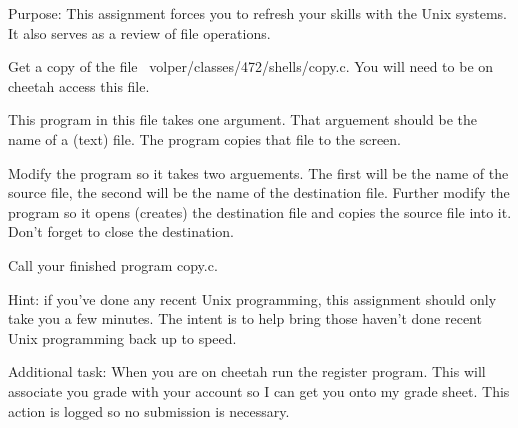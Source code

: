 

\parindent 0pt

Purpose: This assignment forces you to refresh your skills with the Unix
systems.
It also serves as a review of file operations.

Get a copy of the file {\ltt{}~volper/classes/472/shells/copy.c}.
You will need to be on {\ltt{}cheetah} access this file.

This program in this file takes one argument. 
That arguement should be the name of a (text) file.
The program copies that file to the screen.

Modify the program so it takes two arguements.
The first will be the name of the source file, the second
will be the name of the destination file.
Further modify the program so it opens (creates) the destination
file and copies the source file into it.
Don't forget to close the destination.

Call your finished program {\ltt{}copy.c}.

Hint: if you've done any recent Unix programming, this assignment
should only take you a few minutes.
The intent is to help bring those haven't done recent Unix programming
back up to speed.

Additional task: When you are on {\ltt{}cheetah} run the {\ltt{}register}
program. This will associate you grade with your account so
I can get you onto my grade sheet.  This action is logged so
no submission is necessary.
\bye
